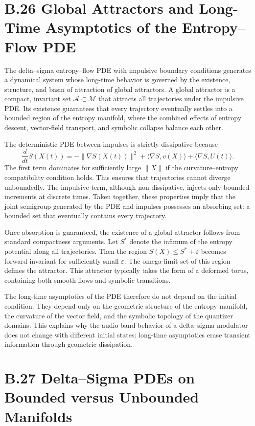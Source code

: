 \section{B.26 Global Attractors and Long-Time Asymptotics of the Entropy–Flow PDE}

The delta–sigma entropy–flow PDE with impulsive boundary conditions generates a dynamical system whose long-time behavior is governed by the existence, structure, and basin of attraction of global attractors. A global attractor is a compact, invariant set \(\mathcal{A}\subset\mathcal{M}\) that attracts all trajectories under the impulsive PDE. Its existence guarantees that every trajectory eventually settles into a bounded region of the entropy manifold, where the combined effects of entropy descent, vector-field transport, and symbolic collapse balance each other.

The deterministic PDE between impulses is strictly dissipative because 
\[
\frac{d}{dt} S(X(t)) = -\|\nabla S(X(t))\|^{2} + \langle \nabla S, v(X)\rangle + \langle\nabla S, U(t)\rangle.
\]
The first term dominates for sufficiently large \(\|X\|\) if the curvature–entropy compatibility condition holds. This ensures that trajectories cannot diverge unboundedly. The impulsive term, although non-dissipative, injects only bounded increments at discrete times. Taken together, these properties imply that the joint semigroup generated by the PDE and impulses possesses an absorbing set: a bounded set that eventually contains every trajectory.

Once absorption is guaranteed, the existence of a global attractor follows from standard compactness arguments. Let \(S^{\ast}\) denote the infimum of the entropy potential along all trajectories. Then the region \(S(X)\le S^{\ast} + \varepsilon\) becomes forward invariant for sufficiently small \(\varepsilon\). The omega-limit set of this region defines the attractor. This attractor typically takes the form of a deformed torus, containing both smooth flows and symbolic transitions.

The long-time asymptotics of the PDE therefore do not depend on the initial condition. They depend only on the geometric structure of the entropy manifold, the curvature of the vector field, and the symbolic topology of the quantizer domains. This explains why the audio band behavior of a delta–sigma modulator does not change with different initial states: long-time asymptotics erase transient information through geometric dissipation.

\section{B.27 Delta–Sigma PDEs on Bounded versus Unbounded Manifolds}


